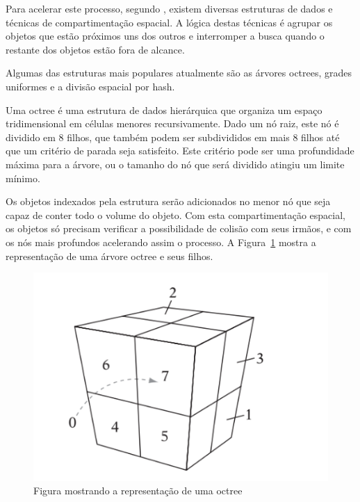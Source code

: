 Para acelerar este processo, segundo , existem diversas estruturas de dados e técnicas de compartimentação espacial. 
A lógica destas técnicas é agrupar os objetos que estão próximos uns dos outros e interromper a busca quando o restante dos objetos estão fora de alcance.

Algumas das estruturas mais populares atualmente são as árvores octrees, grades uniformes e a divisão espacial por hash.


Uma octree é uma estrutura de dados hierárquica que organiza um espaço
tridimensional em células menores recursivamente.
Dado um nó raiz, este nó é dividido em 8  filhos, que também podem ser
subdivididos em mais 8 filhos até que um critério de parada seja satisfeito.
Este critério pode ser uma profundidade máxima para a árvore, ou o tamanho do
nó que será dividido atingiu um limite mínimo.

Os objetos indexados pela estrutura serão adicionados no menor nó que seja capaz de conter todo o volume do objeto.
Com esta compartimentação espacial, os objetos só precisam verificar a possibilidade de colisão com seus irmãos, e com os nós mais profundos acelerando assim o processo. A Figura~\ref{fig:figura1} mostra a representação de uma árvore octree e seus filhos.
\begin{figure}[htb]
  \centering
	\caption{\label{fig:figura1} Figura mostrando a representação de uma octree}
	\includegraphics[scale=0.5]{Imagens/Figura_7.10.png} %
\end{figure}

